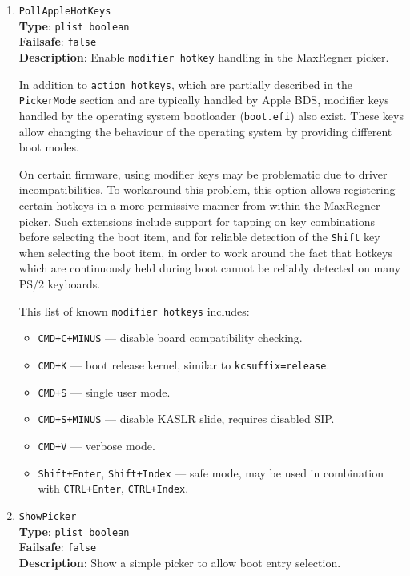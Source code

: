 \documentclass[]{article}
\providecommand{\tightlist}{%
  \setlength{\itemsep}{0pt}\setlength{\parskip}{0pt}}
\begin{document}
\begin{enumerate}
\item
  \texttt{PollAppleHotKeys}\\
  \textbf{Type}: \texttt{plist\ boolean}\\
  \textbf{Failsafe}: \texttt{false}\\
  \textbf{Description}: Enable \texttt{modifier hotkey} handling in the MaxRegner picker.

  In addition to \texttt{action hotkeys}, which are partially described in the \texttt{PickerMode}
  section and are typically handled by Apple BDS, modifier keys handled by the operating system
  bootloader (\texttt{boot.efi}) also exist. These keys allow changing the behaviour of the
  operating system by providing different boot modes.

  On certain firmware, using modifier keys may be problematic due to driver incompatibilities.
  To workaround this problem, this option allows registering certain hotkeys in a more permissive
  manner from within the MaxRegner picker. Such extensions include support for tapping on key
  combinations before selecting the boot item, and for reliable detection of the \texttt{Shift} key
  when selecting the boot item, in order to work around the fact that hotkeys which are continuously
  held during boot cannot be reliably detected on many PS/2 keyboards.

  This list of known \texttt{modifier hotkeys} includes:
  \begin{itemize}
  \tightlist
  \item \texttt{CMD+C+MINUS} --- disable board compatibility checking.
  \item \texttt{CMD+K} --- boot release kernel, similar to \texttt{kcsuffix=release}.
  \item \texttt{CMD+S} --- single user mode.
  \item \texttt{CMD+S+MINUS} --- disable KASLR slide, requires disabled SIP.
  \item \texttt{CMD+V} --- verbose mode.
  \item \texttt{Shift+Enter}, \texttt{Shift+Index} --- safe mode, may be used in
  combination with \texttt{CTRL+Enter}, \texttt{CTRL+Index}.
  \end{itemize}

\item
  \texttt{ShowPicker}\\
  \textbf{Type}: \texttt{plist\ boolean}\\
  \textbf{Failsafe}: \texttt{false}\\
  \textbf{Description}: Show a simple picker to allow boot entry selection.


\end{enumerate}
\end{document}
